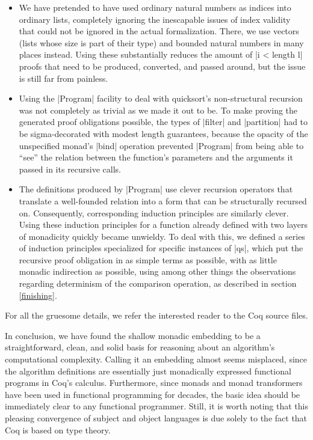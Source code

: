 \documentclass[runningheads]{llncs}
\begin{document}
\begin{itemize}
\item We have pretended to have used ordinary natural numbers as indices into ordinary lists, completely ignoring the inescapable issues of index validity that could not be ignored in the actual formalization. There, we use vectors (lists whose size is part of their type) and bounded natural numbers in many places instead. Using these substantially reduces the amount of |i < length l| proofs that need to be produced, converted, and passed around, but the issue is still far from painless.
\item Using the |Program| facility to deal with quicksort's non-structural recursion was not completely as trivial as we made it out to be. To make proving the generated proof obligations possible, the types of |filter| and |partition| had to be sigma-decorated with modest length guarantees, because the opacity of the unspecified monad's |bind| operation prevented |Program| from being able to ``see'' the relation between the function's parameters and the arguments it passed in its recursive calls.
\item The definitions produced by |Program| use clever recursion operators that translate a well-founded relation into a form that can be structurally recursed on. Consequently, corresponding induction principles are similarly clever. Using these induction principles for a function already defined with two layers of monadicity quickly became unwieldy. To deal with this, we defined a series of induction principles specialized for specific instances of |qs|, which put the recursive proof obligation in as simple terms as possible, with as little monadic indirection as possible, using among other things the observations regarding determinism of the comparison operation, as described in section \ref{finishing}.
\end{itemize}

For all the gruesome details, we refer the interested reader to the Coq source files.

In conclusion, we have found the shallow monadic embedding to be a straightforward, clean, and solid basis for reasoning about an algorithm's computational complexity. Calling it an embedding almost seems misplaced, since the algorithm definitions are essentially just monadically expressed functional programs in Coq's calculus. Furthermore, since monads and monad transformers have been used in functional programming for decades, the basic idea should be immediately clear to any functional programmer. Still, it is worth noting that this pleasing convergence of subject and object languages is due solely to the fact that Coq is based on type theory.
\end{document}
